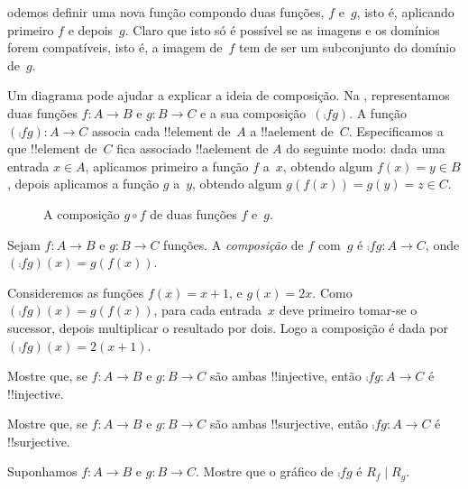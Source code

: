 \documentclass[../../../include/open-logic-section]{subfiles}
\begin{document}

\begin{explain}
odemos definir uma nova
função compondo duas funções, $f$ e~$g$, isto é, aplicando primeiro
$f$ e depois~$g$. Claro que isto só é possível se as imagens e os domínios
forem compatíveis, isto é, a imagem de~$f$ tem de ser um subconjunto do
domínio de~$g$. 

Um diagrama pode ajudar a explicar a ideia de composição. Na
, representamos duas funções $f \colon A \to B$
e $g \colon B \to C$ e a sua composição~$(\comp{f}{g})$. A
função $(\comp{f}{g}) \colon A \to C$ associa cada !!{element} de~$A$
a !!a{element} de~$C$. Especificamos a que !!{element} de~$C$ fica
associado !!a{element} de $A$ do seguinte modo: dada uma entrada $x \in
A$, aplicamos primeiro a função $f$ a~$x$, obtendo algum $f(x)
= y \in B$, depois aplicamos a função $g$ a~$y$, obtendo algum
$g(f(x)) = g(y) = z \in C$.
\begin{figure}[H]
  \caption{A composição $g \circ f$ de duas funções $f$ e~$g$.}
\end{figure}
\end{explain}

\begin{defn}[Composição]
Sejam $f\colon A \to B$ e $g\colon B \to C$ funções. A
\emph{composição} de $f$ com~$g$ é $\comp{f}{g} \colon A \to C$,
onde $(\comp{f}{g})(x) = g(f(x))$.
\end{defn}

\begin{ex}
Consideremos as funções $f(x) = x + 1$, e $g(x) = 2x$. Como
$(\comp{f}{g})(x) = g(f(x))$, para cada entrada~$x$ deve primeiro tomar-se
o sucessor, depois multiplicar o resultado por dois. Logo a composição
é dada por $(\comp{f}{g})(x) = 2(x+1)$.
\end{ex}

\begin{prob}
Mostre que, se $f \colon A \to B$ e $g \colon B \to C$ são ambas
!!{injective}, então $\comp{f}{g}\colon A \to C$ é !!{injective}.
\end{prob}

\begin{prob}
Mostre que, se $f \colon A \to B$ e $g \colon B \to C$ são ambas
!!{surjective}, então $\comp{f}{g}\colon A \to C$ é !!{surjective}.
\end{prob}

\begin{prob}
Suponhamos $f \colon A \to B$ e $g \colon B \to C$. Mostre que o gráfico
de $\comp{f}{g}$ é $R_f \mid R_g$.
\end{prob}
\end{document}
